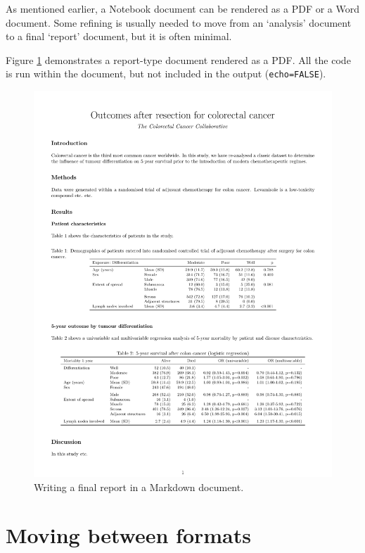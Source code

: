 \documentclass[
  12pt,
  krantz2]{krantz}
\begin{document}
As mentioned earlier, a Notebook document can be rendered as a PDF or a Word document.
Some refining is usually needed to move from an `analysis' document to a final `report' document, but it is often minimal.

Figure \ref{fig:chap13-fig-report} demonstrates a report-type document rendered as a PDF.
All the code is run within the document, but not included in the output (\texttt{echo=FALSE}).

\begin{figure}
\centering
\includegraphics{images/chapter13/4_colon_report.pdf}
\caption{\label{fig:chap13-fig-report}Writing a final report in a Markdown document.}
\end{figure}

\hypertarget{moving-between-formats}{%
\section{Moving between formats}\label{moving-between-formats}}
\end{document}
